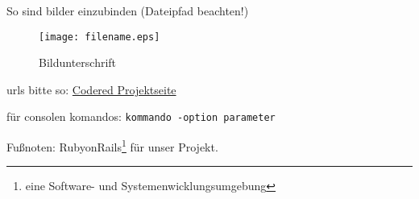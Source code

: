 So sind bilder einzubinden (Dateipfad beachten!)
\begin{figure}[htbp]
\centering
\texttt{[image: filename.eps]}
\caption{Bildunterschrift}
\label{figure:Bildunterschrift}
\end{figure}


urls bitte so:
\href{http://codered.berlios.de}{Codered Projektseite}


für consolen komandos:
\verb|kommando -option parameter|

Fußnoten:
RubyonRails\footnote{eine Software- und Systemenwicklungsumgebung} für unser Projekt.

